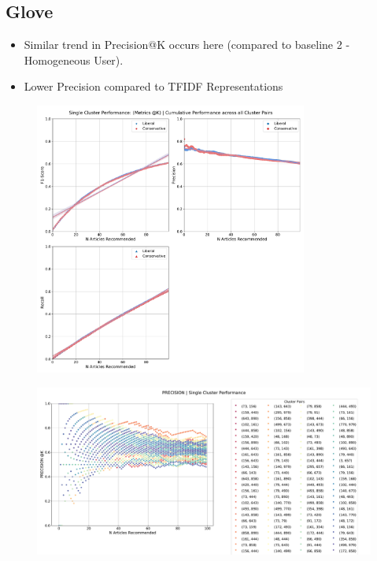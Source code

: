 \documentclass[a4paper,fontsize=8.0pt]{scrartcl}
\begin{document}
\subsection{Glove}
\begin{flushleft}
\begin{itemize}
    \item Similar trend in Precision@K occurs here (compared to baseline 2 - Homogeneous User). 
    \item  Lower Precision compared to TFIDF Representations
\end{itemize}
\end{flushleft}
\begin{figure}[H]
 \includegraphics[width=0.8\textwidth]{Graphs/GLOVE/user_interaction_vs_model_performance_cumu_single_cluster.pdf}
\end{figure}
\begin{figure}[H]
 \includegraphics[width=1.0\textwidth]{Graphs/GLOVE/user_interaction_vs_model_performance_precision_all_cps_single_cluster.pdf}
\end{figure}
\end{document}

